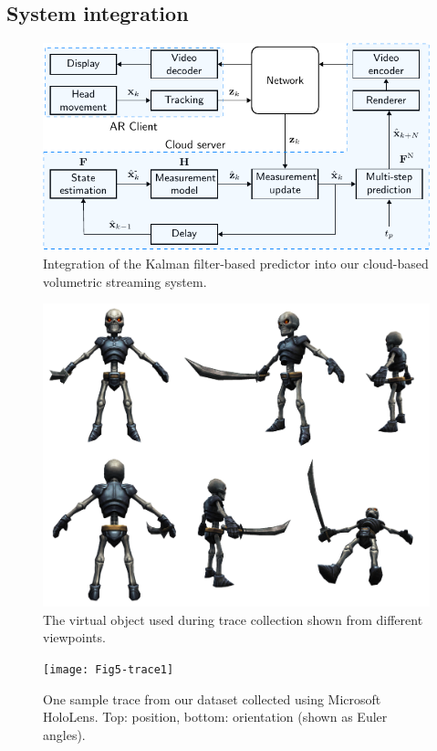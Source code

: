 \documentclass[sigconf]{acmart}			%
\begin{document}
\subsection{System integration}
\label{sec:sys_integration}
\begin{figure}[t]
	\includegraphics[width=\linewidth]{system_kalman.pdf}
	\caption[Kalman filter]{Integration of the Kalman filter-based predictor into our cloud-based volumetric streaming system.}
	\label{fig:system_kalman}
\end{figure}
\begin{figure}[t]
	\centering
	\includegraphics[width=\linewidth]{skeleton2}
	\caption{The virtual object used during trace collection shown from different viewpoints.}
	\label{fig:skeleton}
\end{figure}

\begin{figure}[t]
	\centering
	\texttt{[image: Fig5-trace1]}
	\caption[Sample trace]{One sample trace from our dataset collected using Microsoft HoloLens. Top: position, bottom: orientation (shown as Euler angles).}
	\label{fig:trace1}
\end{figure}
\end{document}
